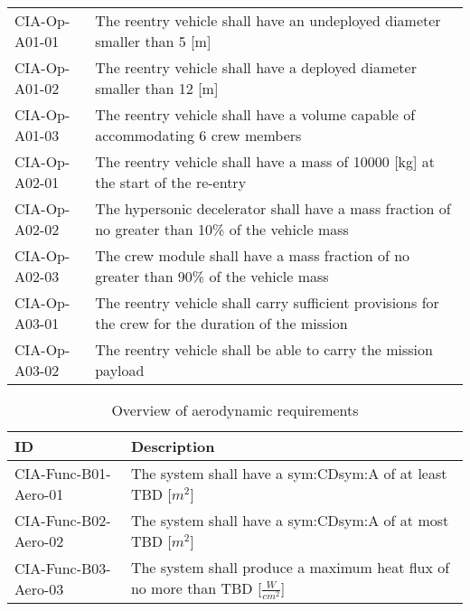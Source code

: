 \begin{table}[H]
\begin{tabular}{|p{}|p{}|}
& \\ \hline
	CIA-Op-A01-01 & The reentry vehicle shall have an undeployed diameter smaller than 5 [m]                         				            \\ \hline
	CIA-Op-A01-02 & The reentry vehicle shall have a deployed diameter smaller than 12 [m]                         				            \\ \hline
	CIA-Op-A01-03 & The reentry vehicle shall have a volume capable of accommodating 6 crew members                        				            \\ \hline
	CIA-Op-A02-01 & The reentry vehicle shall have a mass of 10000 [kg] at the start of the re-entry                       				            \\ \hline
	CIA-Op-A02-02 & The hypersonic decelerator shall have a mass fraction of no greater than 10\% of the vehicle mass  \\ \hline
	CIA-Op-A02-03 & The crew module shall have a mass fraction of no greater than 90\% of the vehicle mass \\ \hline
	CIA-Op-A03-01 & The reentry vehicle shall carry sufficient provisions for the crew for the duration of the mission \\ \hline
	CIA-Op-A03-02 & The reentry vehicle shall be able to carry the mission payload								\\ \hline	
    \end{tabular}
\end{table}


\begin{table}[h]
	\caption*{Overview of aerodynamic requirements}
	\begin{tabular}{|p{}|p{}|}
		\hline
		ID & Description \\
		\hline \hline
		CIA-Func-B01-Aero-01 & The system shall have a \gls{sym:CD}\gls{sym:A} of at least TBD [$m^{2}$] \\ \hline
		CIA-Func-B02-Aero-02 & The system shall have a \gls{sym:CD}\gls{sym:A} of at most TBD [$m^{2}$] \\ \hline
		CIA-Func-B03-Aero-03 & The system shall produce a maximum heat flux of no more than TBD [$\frac{W}{cm^{2}}$] \\ \hline
	\end{tabular}
\end{table}

